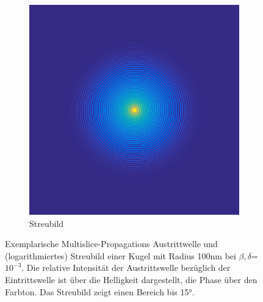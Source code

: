 \begin{figure}
\begin{subfigure}[b]{0.49\textwidth}
		\includegraphics[width=\textwidth]{images/fig_sim_scatter_multislice-r100-bd1e-3.png}
		\caption{Streubild}
		\label{fig:scatter}
	\end{subfigure}
	\caption[Austrittswelle und Streubild einer Kugel]{Exemplarische Multislice-Propagations Austrittwelle und (logarithmiertes) Streubild einer Kugel mit Radius 100\si{nm} bei $\beta,\delta$=$10^{-3}$. Die relative Intensität der Austrittswelle bezüglich der Eintrittswelle ist über die Helligkeit dargestellt, die Phase über den Farbton. Das Streubild zeigt einen Bereich bis 15°.}
	\label{fig:exitscatter}
\end{figure}


